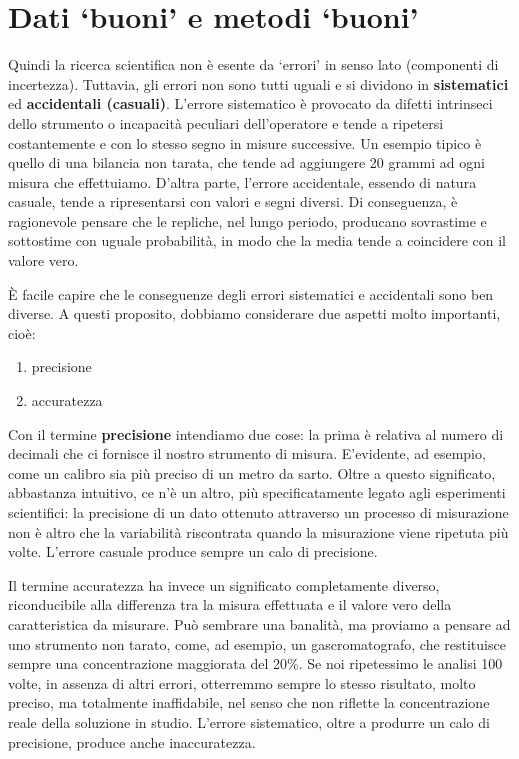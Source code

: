 \documentclass[
  12pt,
]{book}
\providecommand{\tightlist}{%
  \setlength{\itemsep}{0pt}\setlength{\parskip}{0pt}}
\begin{document}
\hypertarget{dati-buoni-e-metodi-buoni}{%
\section{Dati `buoni' e metodi `buoni'}\label{dati-buoni-e-metodi-buoni}}

Quindi la ricerca scientifica non è esente da `errori' in senso lato (componenti di incertezza). Tuttavia, gli errori non sono tutti uguali e si dividono in \textbf{sistematici} ed \textbf{accidentali (casuali)}. L'errore sistematico è provocato da difetti intrinseci dello strumento o incapacità peculiari dell'operatore e tende a ripetersi costantemente e con lo stesso segno in misure successive. Un esempio tipico è quello di una bilancia non tarata, che tende ad aggiungere 20 grammi ad ogni misura che effettuiamo. D'altra parte, l'errore accidentale, essendo di natura casuale, tende a ripresentarsi con valori e segni diversi. Di conseguenza, è ragionevole pensare che le repliche, nel lungo periodo, producano sovrastime e sottostime con uguale probabilità, in modo che la media tende a coincidere con il valore vero.

È facile capire che le conseguenze degli errori sistematici e accidentali sono ben diverse. A questi proposito, dobbiamo considerare due aspetti molto importanti, cioè:

\begin{enumerate}
\def\labelenumi{\arabic{enumi}.}
\tightlist
\item
  precisione
\item
  accuratezza
\end{enumerate}

Con il termine \textbf{precisione} intendiamo due cose: la prima è relativa al numero di decimali che ci fornisce il nostro strumento di misura. E'evidente, ad esempio, come un calibro sia più preciso di un metro da sarto. Oltre a questo significato, abbastanza intuitivo, ce n'è un altro, più specificatamente legato agli esperimenti scientifici: la precisione di un dato ottenuto attraverso un processo di misurazione non è altro che la variabilità riscontrata quando la misurazione viene ripetuta più volte. L'errore casuale produce sempre un calo di precisione.

Il termine accuratezza ha invece un significato completamente diverso, riconducibile alla differenza tra la misura effettuata e il valore vero della caratteristica da misurare. Può sembrare una banalità, ma proviamo a pensare ad uno strumento non tarato, come, ad esempio, un gascromatografo, che restituisce sempre una concentrazione maggiorata del 20\%. Se noi ripetessimo le analisi 100 volte, in assenza di altri errori, otterremmo sempre lo stesso risultato, molto preciso, ma totalmente inaffidabile, nel senso che non riflette la concentrazione reale della soluzione in studio. L'errore sistematico, oltre a produrre un calo di precisione, produce anche inaccuratezza.
\end{document}
